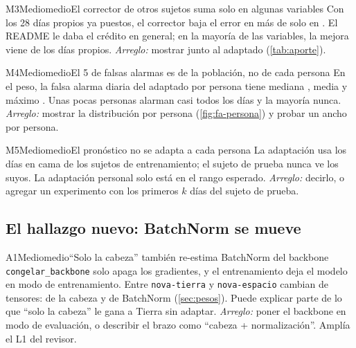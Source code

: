 \begin{hallazgo}{M3}{Medio}{medio}{El corrector de otros sujetos suma solo en algunas variables}
Con los 28 días propios ya puestos, el corrector baja el error en más de  solo en .
El README le daba el crédito en general; en la mayoría de las variables, la mejora viene de los días propios.
\emph{Arreglo:} mostrar  junto al adaptado (\cref{tab:aporte}).
\end{hallazgo}

\begin{hallazgo}{M4}{Medio}{medio}{El 5\pct{} de falsas alarmas es de la población, no de cada persona}
En el peso, la falsa alarma diaria del adaptado por persona tiene mediana \pct, media
\pct{} y máximo \pct. Unas pocas personas alarman casi todos los días y la
mayoría nunca. \emph{Arreglo:} mostrar la distribución por persona (\cref{fig:fa-persona}) y probar un ancho por
persona.
\end{hallazgo}

\begin{hallazgo}{M5}{Medio}{medio}{El pronóstico no se adapta a cada persona}
La adaptación usa los días en cama de los sujetos de entrenamiento; el sujeto de prueba nunca ve los suyos. La
adaptación personal solo está en el rango esperado. \emph{Arreglo:} decirlo, o agregar un experimento con los primeros
$k$ días del sujeto de prueba.
\end{hallazgo}

\subsection{El hallazgo nuevo: BatchNorm se mueve}\label{sec:a1}

\begin{hallazgo}{A1}{Medio}{medio}{\enquote{Solo la cabeza} también re-estima BatchNorm del backbone}
\texttt{congelar\_backbone} solo apaga los gradientes, y el entrenamiento deja el modelo en modo de entrenamiento.
Entre \texttt{nova-tierra} y \texttt{nova-espacio} cambian  de  tensores:
 de la cabeza y  de BatchNorm (\cref{sec:pesos}). Puede explicar parte de lo que
\enquote{solo la cabeza} le gana a Tierra sin adaptar. \emph{Arreglo:} poner el backbone en modo de evaluación, o
describir el brazo como \enquote{cabeza + normalización}. Amplía el L1 del revisor.
\end{hallazgo}

